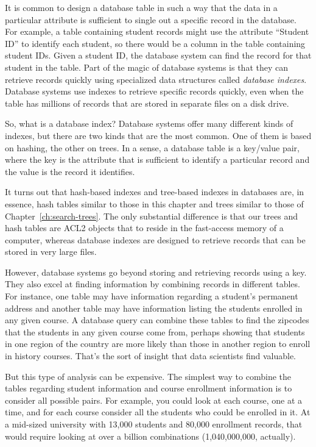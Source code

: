 It is common to design a database table in such a way that the
data in a particular attribute is sufficient 
to single out a specific record in the database. 
For example, a table containing student records might use the attribute
``Student ID'' to identify each student, so there would be
a column in the table containing student IDs.
Given a student ID, the
database system can find the record for that student in the
table. Part of the magic of database systems is that they can retrieve
records quickly using specialized data
structures called \emph{database indexes}. 
Database systems use indexes to retrieve specific records quickly, 
even when the table has millions of records that are stored
in separate files on a disk drive.

So, what is a database index? Database systems
offer many different kinds of indexes, but there are two kinds that are
the most common. One of them is based on hashing, the other on trees.
In a sense, a database
table is a key/value pair, where the key is the attribute that is
sufficient to identify a particular record and the value is the record
it identifies.

It turns out that hash-based indexes and tree-based indexes
in databases are, 
in essence, hash tables similar to those in this chapter 
and trees similar to those of Chapter~\ref{ch:search-trees}.
The only substantial difference
is that our trees and hash tables are ACL2 objects that
to reside in the fast-access memory of a computer, 
whereas database indexes are designed to retrieve records 
that can be stored in very large files.

However, database systems go beyond storing and retrieving records
using a key. They also excel at finding information by combining
records in different tables. For instance, one table may have
information regarding a student's permanent address and another table
may have information listing the students enrolled in any given course.
A database query can combine these tables to find the zipcodes that
the students in any given course come from, perhaps showing that students in one
region of the country are more likely than those in another region to
enroll in history courses. That's the sort of insight that
data scientists find valuable.

But this type of analysis can be expensive. The simplest
way to combine the tables regarding student information and course
enrollment information is to consider all possible pairs. For example,
you could look at each course, one at a time, and for each course consider
all the students who could be enrolled in it. At a mid-sized university
with 13,000 students and 80,000 enrollment records, that would require
looking at over a billion combinations (1,040,000,000, actually).

